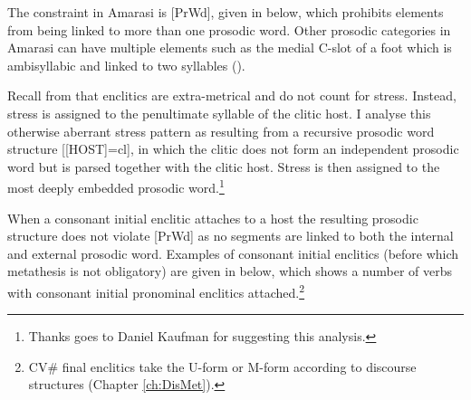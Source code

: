 The constraint in Amarasi is [PrWd], given in  below,
which prohibits elements from being linked to more than one prosodic word.
Other prosodic categories in Amarasi can have multiple elements
such as the medial C-slot of a foot which is ambisyllabic
and linked to two syllables ().

\begin{exe}
	\label{as:CrispEdge[S]}
\end{exe}

Recall from  that enclitics are extra-metrical and do not count for stress.
Instead, stress is assigned to the penultimate syllable of the clitic host.
I analyse this otherwise aberrant stress pattern as resulting
from a recursive prosodic word structure [[HOST]=cl],
in which the clitic does not form an independent prosodic word
but is parsed together with the clitic host.
Stress is then assigned to the most deeply embedded prosodic word.\footnote{
		Thanks goes to Daniel Kaufman for suggesting this analysis.}

When a consonant initial enclitic attaches to
a host the resulting prosodic structure
does not violate [PrWd] as no segments are linked
to both the internal and external prosodic word.
Examples of consonant initial enclitics (before which metathesis
is not obligatory) are given in  below,
which shows a number of verbs with consonant initial pronominal enclitics attached.\footnote{
		CV{\#} final enclitics take the U-form or M-form
		according to discourse structures (Chapter \ref{ch:DisMet}).}

